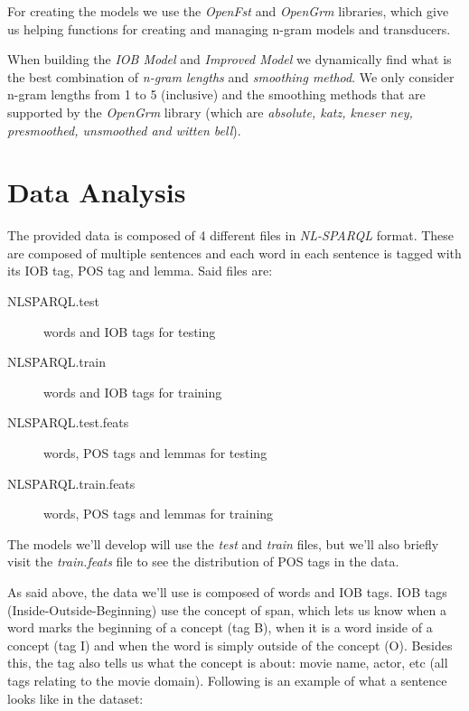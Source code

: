 \documentclass[11pt,a4paper]{article}
\begin{document}
	For creating the models we use the \textit{OpenFst} \cite{openfst} and \textit{OpenGrm} \cite{opengrm} libraries, which give us helping functions for creating and managing n-gram models and transducers.

	When building the \textit{IOB Model} and \textit{Improved Model} we dynamically find what is the best combination of \textit{n-gram lengths} and \textit{smoothing method}. We only consider n-gram lengths from 1 to 5 (inclusive) and the smoothing methods that are supported by the \textit{OpenGrm} library (which are \textit{absolute, katz, kneser ney, presmoothed, unsmoothed and witten bell}).
	
\section{Data Analysis}
\label{sec-data-analysis}

	The provided data is composed of 4 different files in \textit{NL-SPARQL} format. These are composed of multiple sentences and each word in each sentence is tagged with its IOB tag, POS tag and lemma. Said files are:
	
	\begin{description}
		\item[NLSPARQL.test] words and IOB tags for testing
		\item[NLSPARQL.train] words and IOB tags for training              
		\item[NLSPARQL.test.feats] words, POS tags and lemmas for testing
		\item[NLSPARQL.train.feats] words, POS tags and lemmas for training
	\end{description}

	The models we'll develop will use the \textit{test} and \textit{train} files, but we'll also briefly visit the \textit{train.feats} file to see the distribution of POS tags in the data.
	
	As said above, the data we'll use is composed of words and IOB tags. IOB tags (Inside-Outside-Beginning) use the concept of span, which lets us know when a word marks the beginning of a concept (tag B), when it is a word inside of a concept (tag I) and when the word is simply outside of the concept (O). Besides this, the tag also tells us what the concept is about: movie name, actor, etc (all tags relating to the movie domain). Following is an example of what a sentence looks like in the dataset:
	
\end{document}
